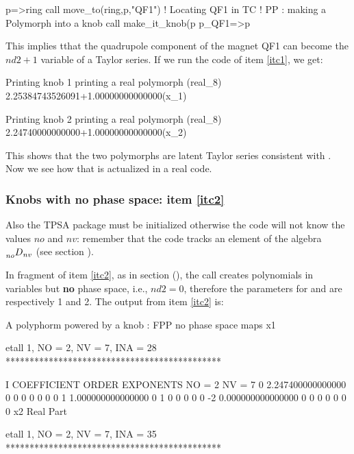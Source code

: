 \documentclass{hitec}     %
\begin{document}
{{{{{{\begin{code}
p=>ring%
call move_to(ring,p,"QF1")   !  Locating QF1 in TC
!  PP : making a Polymorph into a knob
call make_it_knob(p%
p_QF1=>p
\end{code}

This implies tthat the quadrupole component  of the magnet QF1 can become the $nd2+1$ variable of a Taylor series. If we run the code of item \ref{itc1}, we get:

\begin{code}
 Printing knob 1
  printing a real polymorph (real_8)
2.25384743526091+1.00000000000000(x_1)

 Printing knob 2
  printing a real polymorph (real_8)
2.24740000000000+1.00000000000000(x_2)
\end{code}

This shows that the two polymorphs are latent Taylor series consistent with . Now we see how that is actualized in a real code.

\subsubsection{Knobs with no phase space: item \ref{itc2}}
\label{s:initigno}


 Also the TPSA package must be initialized otherwise the code will not know the values $no$ and  $nv$: remember that the code tracks an element of the algebra $\prescript{}{no}{D}_{nv}$ (see section ).

In fragment of item \ref{itc2},  as in section (), the call  creates polynomials in  variables but {\bf no} phase space, i.e., $nd2=0$, therefore the parameters for  and  are respectively 1 and 2.  The output from item \ref{itc2} is:

\renewcommand{\codefont}{\footnotesize}
\begin{code}
 A polyphorm powered by a knob : FPP no phase space maps
  x1

 etall    1, NO =    2, NV =    7, INA =   28
 *********************************************

    I  COEFFICIENT          ORDER   EXPONENTS
      NO =     2      NV =     7
   0   2.247400000000000       0  0  0  0  0  0  0
   1   1.000000000000000       0  1  0  0  0  0  0
    -2   0.000000000000000       0  0  0  0  0  0  0
  x2
  Real Part

 etall    1, NO =    2, NV =    7, INA =   35
 *********************************************


\end{code}}}}}}}
\end{document}

